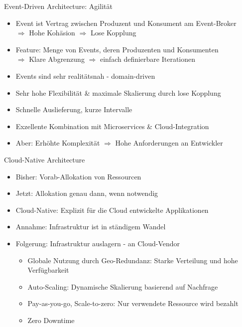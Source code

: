 \begin{frame}{Event-Driven Architecture: Agilität}
    \begin{itemize}
        \item Event ist Vertrag zwischen Produzent und Konsument am Event-Broker\\
        $\Rightarrow$ Hohe Kohäsion $\Rightarrow$ Lose Kopplung
        \item Feature: Menge von Events, deren Produzenten und Konsumenten\\
        $\Rightarrow$ Klare Abgrenzung $\Rightarrow$ einfach definierbare Iterationen
        \item Events sind sehr realitätsnah - domain-driven
        \item Sehr hohe Flexibilität \& maximale Skalierung durch lose Kopplung
        \item Schnelle Auslieferung, kurze Intervalle
        \item Exzellente Kombination mit Microservices \& Cloud-Integration
        \item Aber: Erhöhte Komplexität $\Rightarrow$ Hohe Anforderungen an Entwickler
    \end{itemize}
\end{frame}


\begin{frame}{Cloud-Native Architecture}
    \begin{itemize}
        \item Bisher: Vorab-Allokation von Ressourcen
        \item Jetzt: Allokation genau dann, wenn notwendig
        \item Cloud-Native: Explizit für die Cloud entwickelte Applikationen \cite{cloudNative}
        \item Annahme: Infrastruktur ist in ständigem Wandel
        \item Folgerung: Infrastruktur auslagern - an Cloud-Vendor
        \begin{itemize}
            \item Globale Nutzung durch Geo-Redundanz: Starke Verteilung und hohe Verfügbarkeit
            \item Auto-Scaling: Dynamische Skalierung basierend auf Nachfrage
            \item Pay-as-you-go, Scale-to-zero: Nur verwendete Ressource wird bezahlt
            \item Zero Downtime
        \end{itemize}
    \end{itemize}
\end{frame}

